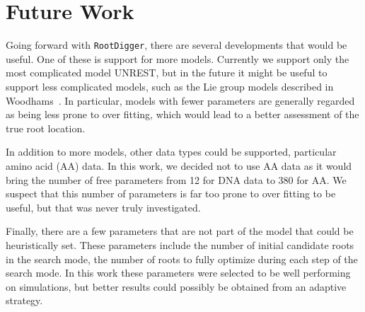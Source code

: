 \documentclass{article}
\newcommand{\RootDiggertt}{\texttt{RootDigger}}
\begin{document}
\section{Future Work}

Going forward with \RootDiggertt{}, there are several developments that would be
useful. One of these is support for more models. Currently we support only the
most complicated model UNREST, but in the future it might be useful to support
less complicated models, such as the Lie group models described in
Woodhams~\cite{woodhams_new_2015}.  In particular, models with fewer parameters
are generally regarded as being less prone to over fitting, which would lead to
a better assessment of the true root location.

In addition to more models, other data types could be supported, particular
amino acid (AA) data. In this work, we decided not to use AA data as it would
bring the number of free parameters from 12 for DNA data to $380$ for AA. We
suspect that this number of parameters is far too prone to over fitting to be
useful, but that was never truly investigated.

Finally, there are a few parameters that are not part of the model that could be
heuristically set. These parameters include the number of initial candidate
roots in the search mode, the number of roots to fully optimize during each step
of the search mode. In this work these parameters were selected to be well
performing on simulations, but better results could possibly be obtained from an
adaptive strategy.



\end{document}
